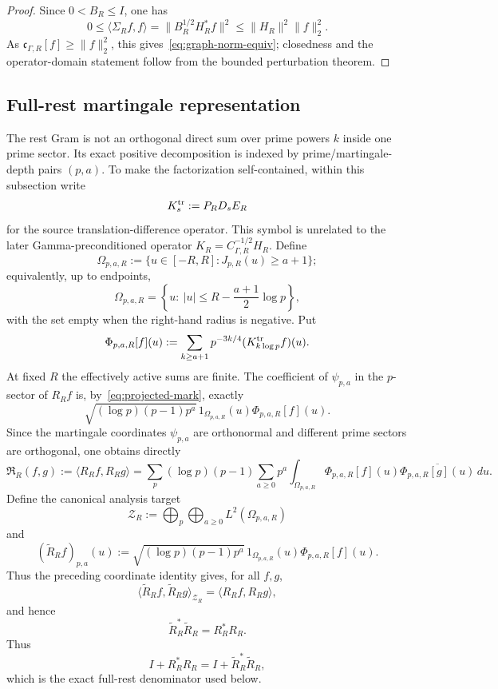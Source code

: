 \documentclass[11pt,a4paper]{amsart}
\begin{document}
\begin{proof}
Since $0<B_R\le I$, one has
\[
 0\le\langle\Sigma_Rf,f\rangle
 =\|B_R^{1/2}H_R^*f\|^2
 \le\|H_R\|^2\|f\|_2^2.
\]
As $\mathfrak c_{\Gamma,R}[f]\ge\|f\|_2^2$, this gives~\eqref{eq:graph-norm-equiv}; closedness and the
operator-domain statement follow from the bounded perturbation theorem.
\end{proof}

\subsection{Full-rest martingale representation}

The rest Gram is not an orthogonal direct sum over prime powers $k$ inside one prime
sector.  Its exact positive decomposition is indexed by prime/martingale-depth pairs
$(p,a)$.  To make the factorization self-contained, within this subsection write
\[
 K_s^{\rm tr}:=P_RD_sE_R
\]
for the source translation-difference operator.  This symbol is unrelated to the later
Gamma-preconditioned operator $K_R=C_{\Gamma,R}^{-1/2}H_R$.  Define
\[
 \Omega_{p,a,R}
 :=\{u\in[-R,R]:J_{p,R}(u)\ge a+1\};
\]
equivalently, up to endpoints,
\[
 \Omega_{p,a,R}
 =\left\{u:\ |u|\le R-\frac{a+1}{2}\log p\right\},
\]
with the set empty when the right-hand radius is negative.  Put
\[
 \Phi_{p,a,R}[f](u)
 :=\sum_{k\ge a+1}p^{-3k/4}(K_{k\log p}^{\rm tr}f)(u).
\]
At fixed $R$ the effectively active sums are finite.  The coefficient of
$\psi_{p,a}$ in the $p$-sector of $R_Rf$ is, by~\eqref{eq:projected-mark}, exactly
\[
 \sqrt{(\log p)(p-1)p^a}\,
 1_{\Omega_{p,a,R}}(u)\Phi_{p,a,R}[f](u).
\]
Since the martingale coordinates $\psi_{p,a}$ are orthonormal and different prime
sectors are orthogonal, one obtains directly
\[
 \mathfrak R_R(f,g):=\langle R_Rf,R_Rg\rangle
 =\sum_p(\log p)(p-1)\sum_{a\ge0}p^a
 \int_{\Omega_{p,a,R}}
 \Phi_{p,a,R}[f](u)\overline{\Phi_{p,a,R}[g](u)}\,du.
\tag{3.4}\label{eq:rest-gram}
\]
Define the canonical analysis target
\[
 \mathscr Z_R:=\bigoplus_p\bigoplus_{a\ge0}L^2(\Omega_{p,a,R})
\]
and
\[
 (\widetilde R_Rf)_{p,a}(u)
 :=\sqrt{(\log p)(p-1)p^a}\,
 1_{\Omega_{p,a,R}}(u)\Phi_{p,a,R}[f](u).
\]
Thus the preceding coordinate identity gives, for all $f,g$,
\[
 \langle\widetilde R_Rf,\widetilde R_Rg\rangle_{\mathscr Z_R}
 =\langle R_Rf,R_Rg\rangle,
\]
and hence
\[
 \boxed{\widetilde R_R^*\widetilde R_R=R_R^*R_R.}
\tag{3.5}\label{eq:full-rest-gram}
\]
Thus
\[
 I+R_R^*R_R=I+\widetilde R_R^*\widetilde R_R,
\]
which is the exact full-rest denominator used below.
\end{document}
